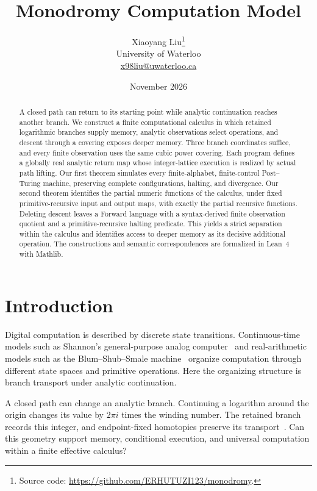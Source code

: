 \documentclass[11pt]{article}
\title{Monodromy Computation Model}
\author{Xiaoyang Liu\thanks{Source code:
  \url{https://github.com/ERHUTUZI123/monodromy}.}\\[0.2em]
  \small University of Waterloo\\
  \small\href{mailto:x98liu@uwaterloo.ca}{x98liu@uwaterloo.ca}}
\date{November 2026}
\numberwithin{equation}{section}
\theoremstyle{definition}
\theoremstyle{remark}
\begin{document}
\maketitle

\begin{abstract}
A closed path can return to its starting point while analytic continuation
reaches another branch. We construct a finite computational calculus in
which retained logarithmic branches supply memory, analytic observations
select operations, and descent through a covering exposes deeper memory.
Three branch coordinates suffice, and every finite observation uses the
same cubic power covering. Each program defines a globally real analytic
return map whose integer-lattice execution is realized by actual path
lifting. Our first theorem simulates every finite-alphabet, finite-control
Post--Turing machine, preserving complete configurations, halting, and
divergence. Our second theorem identifies the partial numeric functions
of the calculus, under fixed primitive-recursive input and output maps,
with exactly the partial recursive functions. Deleting descent leaves a
Forward language with a syntax-derived finite observation quotient and a
primitive-recursive halting predicate. This yields a strict separation
within the calculus and identifies access to deeper memory as its decisive
additional operation. The constructions and semantic correspondences are
formalized in Lean~4 with Mathlib.
\end{abstract}

\section{Introduction}

Digital computation is described by discrete state transitions.
Continuous-time models such as Shannon's general-purpose analog
computer~\cite{shannon1941} and real-arithmetic models such as the
Blum--Shub--Smale machine~\cite{blumShubSmale1989} organize computation
through different state spaces and primitive operations. Here the
organizing structure is branch transport under analytic continuation.

A closed path can change an analytic branch. Continuing a logarithm
around the origin changes its value by $2\pi i$ times the winding
number. The retained branch records this integer, and endpoint-fixed
homotopies preserve its transport~\cite[\S1.3]{hatcher2002}.
Can this geometry support memory, conditional execution, and universal
computation within a finite effective calculus?
\end{document}
